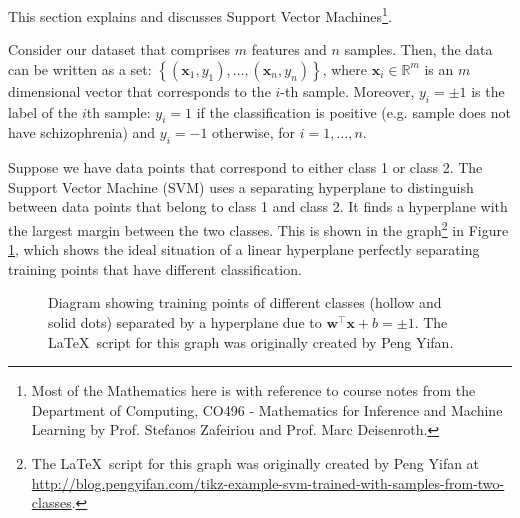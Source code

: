 \documentclass[12pt, twoside, a4paper]{report}
\def\vec{\boldsymbol}
\begin{document}
This section explains and discusses Support Vector Machines\footnote{Most of the Mathematics here is with reference to course notes from the Department of Computing, CO496 - Mathematics for Inference and Machine Learning by Prof. Stefanos Zafeiriou and Prof. Marc Deisenroth.}.

Consider our dataset that comprises $m$ features and $n$ samples. Then, the data can be written as a set: $\left\lbrace (\boldsymbol{x}_1, y_1), \dots, (\boldsymbol{x}_n, y_n) \right\rbrace$, where $\boldsymbol{x}_i \in \mathbb{R}^m$ is an $m$ dimensional vector that corresponds to the $i$-th sample. Moreover, $y_i = \pm 1$ is the label of the $i$th sample: $y_i = 1$ if the classification is positive (e.g. sample does not have schizophrenia) and $y_i = -1$ otherwise, for $i = 1, \dots , n$.

Suppose we have data points that correspond to either class 1 or class 2. The Support Vector Machine (SVM) \cite{RefWorks:122} uses a separating hyperplane to distinguish between data points that belong to class 1 and class 2. It finds a hyperplane with the largest margin between the two classes. This is shown in the graph\footnote{The \LaTeX $\,$ script for this graph was originally created by Peng Yifan at \url{http://blog.pengyifan.com/tikz-example-svm-trained-with-samples-from-two-classes}.} in Figure \ref{bg:svm:diag}, which shows the ideal situation of a linear hyperplane perfectly separating training points that have different classification.

\begin{figure}
\centering
{}
\caption{Diagram showing training points of different classes (hollow and solid dots) separated by a hyperplane due to $\vec{w}^\top \vec{x} + b = \pm 1$. The \LaTeX $\,$ script for this graph was originally created by Peng Yifan.}
\label{bg:svm:diag}
\end{figure}
\end{document}
